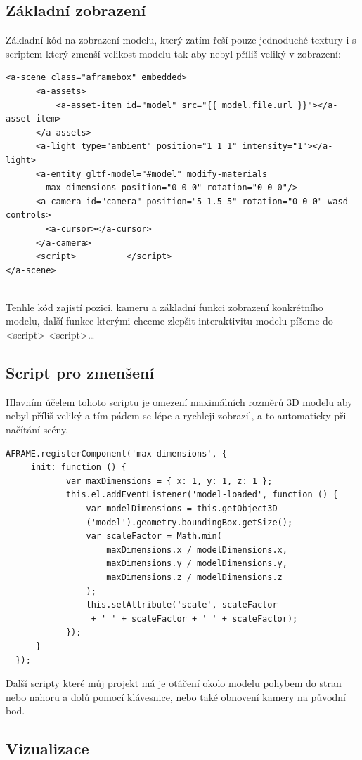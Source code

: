 \documentclass[12pt, a4paper,
twoside,        %
openright
]{report}
\begin{document}
\subsection[Základní zobrazení]{Základní zobrazení}
Základní kód na zobrazení modelu, který zatím řeší pouze jednoduché textury i s scriptem který zmenší velikost modelu tak aby nebyl příliš veliký v zobrazení:
\begin{lstlisting}
<a-scene class="aframebox" embedded>
      <a-assets>
          <a-asset-item id="model" src="{{ model.file.url }}"></a-asset-item>
      </a-assets>
      <a-light type="ambient" position="1 1 1" intensity="1"></a-light>
      <a-entity gltf-model="#model" modify-materials 
      	max-dimensions position="0 0 0" rotation="0 0 0"/>
      <a-camera id="camera" position="5 1.5 5" rotation="0 0 0" wasd-controls>
      	<a-cursor></a-cursor>
      </a-camera>
      <script>          </script>
</a-scene>
                  
\end{lstlisting}
Tenhle kód zajistí pozici, kameru a základní funkci zobrazení konkrétního modelu, další funkce kterými chceme zlepšit interaktivitu modelu píšeme do <script>   <script>\dots
\newpage
\subsection[Script pro zmenšení]{Script pro zmenšení}
Hlavním účelem tohoto scriptu je omezení maximálních rozměrů 3D modelu aby nebyl příliš veliký a tím pádem se lépe a rychleji zobrazil, a to automaticky při načítání scény.
\begin{lstlisting}
AFRAME.registerComponent('max-dimensions', {
   	 init: function () {
        	var maxDimensions = { x: 1, y: 1, z: 1 };
        	this.el.addEventListener('model-loaded', function () {
        		var modelDimensions = this.getObject3D
        		('model').geometry.boundingBox.getSize();
        		var scaleFactor = Math.min(
        			maxDimensions.x / modelDimensions.x,
        			maxDimensions.y / modelDimensions.y,
       				maxDimensions.z / modelDimensions.z
        		);
        		this.setAttribute('scale', scaleFactor
        		 + ' ' + scaleFactor + ' ' + scaleFactor);
        	});
   	  }
  });
\end{lstlisting}
Další scripty které můj projekt má je otáčení okolo modelu pohybem do stran nebo nahoru a dolů pomocí klávesnice, nebo také obnovení kamery na původní bod.
\subsection[Vizualizace]{Vizualizace}
\end{document}
